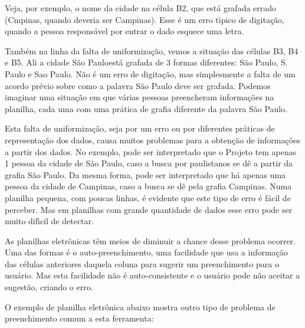 \documentclass[
12pt,		%
openright,	%
twoside,  %
a4paper,			%
chapter=TITLE,		%
english,			%
french,				%
spanish,			%
brazil				%
]{USPSC-classe/USPSC}
\begin{document}
Veja, por exemplo, o nome da cidade na c\'elula B2, que est\'a grafada errado (Cmpinas, quando deveria ser Campinas). Esse \'e um erro t\'{\i}pico de digita\c{c}\~ao, quando a pessoa respons\'avel por entrar o dado esquece uma letra.


Tamb\'em na linha da falta de uniformiza\c{c}\~ao, vemos a situa\c{c}\~ao das c\'elulas B3, B4 e B5. Ali a cidade \textquotedbl S\~ao Paulo\textquotedbl  est\'a grafada de 3 formas diferentes: S\~ao Paulo, S. Paulo e Sao Paulo. N\~ao \'e um erro de digita\c{c}\~ao, mas simplesmente a falta de um acordo pr\'evio sobre como a palavra S\~ao Paulo deve ser grafada. Podemos imaginar uma situa\c{c}\~ao em que v\'arias pessoas preencheram informa\c{c}\~oes na planilha, cada uma com uma pr\'atica de grafia diferente da palavra S\~ao Paulo.


Esta falta de uniformiza\c{c}\~ao, seja por um erro ou por diferentes pr\'aticas de representa\c{c}\~ao dos dados, causa muitos problemas para a obten\c{c}\~ao de informa\c{c}\~oes a partir dos dados. No exemplo, pode ser interpretado que o Projeto tem apenas 1 pessoa da cidade de S\~ao Paulo, caso a busca por paulistanos se d\^e a partir da grafia \textquotedbl S\~ao Paulo\textquotedbl . Da mesma forma, pode ser interpretado que h\'a apenas uma pessoa da cidade de Campinas, caso a busca se d\^e pela grafia \textquotedbl Campinas\textquotedbl . Numa planilha pequena, com poucas linhas, \'e evidente que este tipo de erro \'e f\'acil de perceber. Mas em planilhas com grande quantidade de dados esse erro pode ser muito dif\'{\i}cil de detectar.


As planilhas eletr\^onicas t\^em meios de diminuir a chance desse problema ocorrer. Uma das formas \'e o auto-preenchimento, uma facilidade que usa a informa\c{c}\~ao das c\'elulas anteriores daquela coluna para sugerir um preenchimento para o usu\'ario. Mas esta facilidade n\~ao \'e auto-consistente e o usu\'ario pode n\~ao aceitar a sugest\~ao, criando o erro.


O exemplo de planilha eletr\^onica abaixo mostra outro tipo de problema de preenchimento comum a esta ferramenta:
\end{document}

